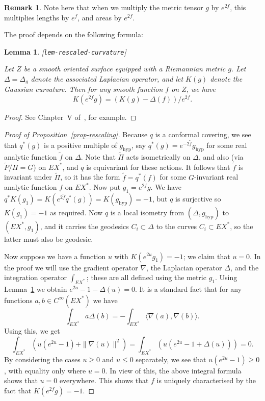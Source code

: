 \documentclass[reqno]{amsart}
\newcommand{\lbl}[1]{\label{#1}\textup{[\texttt{#1}]}\par}
\newcommand{\lbl}{\label}
\newcommand{\hyp}	{\operatorname{hyp}}
\newcommand{\Dl}        {\Delta}
\newcommand{\ip}[1]     {\langle #1\rangle}
\newcommand{\tP}	{\widetilde{P}}
\newcommand{\tf}	{\widetilde{f}}
\newcommand{\tPi}	{\widetilde{\Pi}}
\renewcommand{\:}{\colon}
\newtheorem{lemma}[theorem]{Lemma}
\theoremstyle{definition}
\newtheorem{remark}[theorem]{Remark}
\begin{document}
\begin{remark}
 Note here that when we multiply the metric tensor $g$ by $e^{2f}$,
 this multiplies lengths by $e^f$, and areas by $e^{2f}$.
\end{remark}

The proof depends on the following formula:
\begin{lemma}\lbl{lem-rescaled-curvature}
 Let $Z$ be a smooth oriented surface equipped with a Riemannian
 metric $g$.  Let $\Delta=\Dl_g$ denote the associated Laplacian
 operator, and let $K(g)$ denote the Gaussian curvature.  Then for any
 smooth function $f$ on $Z$, we have
 \[ K(e^{2f}g) = (K(g) - \Dl(f))/e^{2f}. \]
\end{lemma}
\begin{proof}
 See Chapter~V of~\cite{scya:ldg}, for example.
\end{proof}

\begin{proof}[Proof of Proposition~\ref{prop-rescaling}]
 Because $q$ is a conformal covering, we see that $q^*(g)$ is a
 positive multiple of $g_{\hyp}$, say
 $q^*(g)=e^{-2\tf}g_{\hyp}$ for some real analytic function
 $\tf$ on $\Dl$.  Note that $\tPi$ acts isometrically on $\Dl$, and
 also (via $\tP/\Pi=G$) on $EX^*$, and $q$ is equivariant for these
 actions.  It follows that $\tf$ is invariant under $\tPi$, so it has
 the form $\tf=q^*(f)$ for some $G$-invariant real analytic function
 $f$ on $EX^*$.  Now put $g_1=e^{2f}g$.  We have
 $q^*K(g_1)=K(e^{2\tf}q^*(g))=K(g_{\hyp})=-1$, but $q$ is
 surjective so $K(g_1)=-1$ as required.  Now $q$ is a local isometry
 from $(\Dl,g_{\hyp})$ to $(EX^*,g_1)$, and it carries the
 geodesics $C_i\subset\Dl$ to the curves $C_i\subset EX^*$, so the
 latter must also be geodesic.

 Now suppose we have a function $u$ with $K(e^{2u}g_1)=-1$; we
 claim that $u=0$.  In the proof we will use the gradient operator
 $\nabla$, the Laplacian operator $\Dl$, and the integration operator
 $\int_{EX^*}$; these are all defined using the metric $g_1$.  Using
 Lemma~\ref{lem-rescaled-curvature} we obtain $e^{2u}-1-\Dl(u)=0$.
 It is a standard fact that for any functions $a,b\in C^\infty(EX^*)$
 we have
 \[ \int_{EX^*} a\Dl(b) = -\int_{EX^*} \ip{\nabla(a),\nabla(b)}. \]
 Using this, we get
 \[ \int_{EX^*}\left(u(e^{2u}-1)+\|\nabla(u)\|^2\right)
    = \int_{EX^*}\left(u(e^{2u}-1+\Delta(u))\right) = 0.
 \]
 By considering the cases $u\geq 0$ and $u\leq 0$ separately, we see
 that $u(e^{2u}-1)\geq 0$, with equality only where $u=0$.  In view of
 this, the above integral formula shows that $u=0$ everywhere.  This
 shows that $f$ is uniquely characterised by the fact that
 $K(e^{2f}g)=-1$.
\end{proof}
\end{document}

